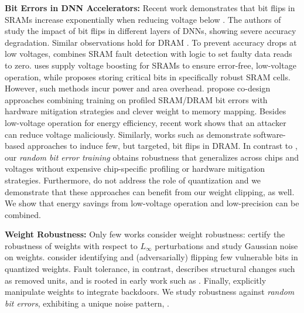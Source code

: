 \textbf{Bit Errors in DNN Accelerators:} Recent work \cite{GanapathyDAC2017,GanapathyHPCA2019} demonstrates that bit flips in SRAMs increase exponentially when reducing voltage below \Vmin. The authors of~\cite{ChandramoorthyHPCA2019} study the impact of bit flips in different layers of DNNs, showing severe accuracy degradation. Similar observations hold for DRAM \cite{ChangPOMACS2017}. To prevent accuracy drops at low voltages, \cite{ReagenISCA2016} combines SRAM fault detection with logic to set faulty data reads to zero. \cite{ChandramoorthyHPCA2019} uses supply voltage boosting for SRAMs to ensure error-free, low-voltage operation, while \cite{SrinivasanDATE2016} proposes storing critical bits in specifically robust SRAM cells. However, such methods incur power and area overhead.  \cite{KimDATE2018,KoppulaMICRO2019} propose co-design approaches combining training on profiled SRAM/DRAM bit errors with hardware mitigation strategies and clever weight to memory mapping. Besides low-voltage operation for energy efficiency, recent work \cite{TangUSENIX2017} shows that an attacker can reduce voltage maliciously. Similarly, works such as \cite{KimISCA2014,MurdockSP2020} demonstrate software-based approaches to induce few, but targeted, bit flips in DRAM. In contrast to \cite{KimDATE2018,KoppulaMICRO2019}, our \emph{random bit error training} obtains robustness that generalizes across chips and voltages without expensive chip-specific profiling or hardware mitigation strategies. Furthermore, \cite{KimDATE2018,KoppulaMICRO2019} do not address the role of quantization and we demonstrate that these approaches can benefit from our weight clipping, as well. We show that energy savings from low-voltage operation and low-precision \cite{ParkISCA2018} can be combined.

\textbf{Weight Robustness:} Only few works consider weight robustness: \citep{WengAAAI2020} certify the robustness of weights with respect to $L_\infty$ perturbations and \citep{CheneyARXIV2017} study Gaussian noise on weights. \citep{RakinICCV2019,HeCVPR2020} consider identifying and (adversarially) flipping few vulnerable bits in quantized weights.
Fault tolerance, in contrast, describes structural changes such as removed units, and is rooted in early work such as \citep{NetiTNN1992,Chiu1994}.
Finally, \citep{JiCCS2018,DumfordARXIV2018} explicitly manipulate weights to integrate backdoors. We study robustness against \emph{random bit errors}, exhibiting a unique noise pattern, \cf {}.

